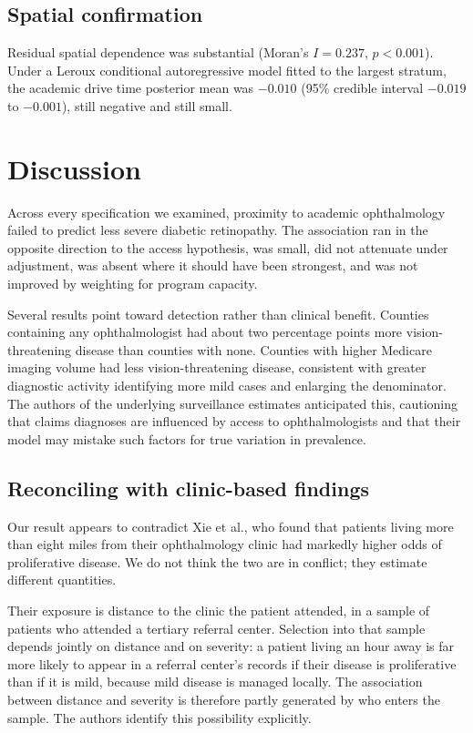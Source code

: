 \documentclass[11pt]{article}
\begin{document}
\subsection{Spatial confirmation}

Residual spatial dependence was substantial (Moran's $I = 0.237$, $p<0.001$).
Under a Leroux conditional autoregressive model fitted to the largest stratum,
the academic drive time posterior mean was $-0.010$ (95\% credible interval
$-0.019$ to $-0.001$), still negative and still small.

\section{Discussion}

Across every specification we examined, proximity to academic ophthalmology
failed to predict less severe diabetic retinopathy. The association ran in the
opposite direction to the access hypothesis, was small, did not attenuate under
adjustment, was absent where it should have been strongest, and was not improved
by weighting for program capacity.

Several results point toward detection rather than clinical benefit. Counties containing any
ophthalmologist had about two percentage points more vision-threatening disease
than counties with none. Counties with higher Medicare imaging volume had less
vision-threatening disease, consistent with greater diagnostic activity
identifying more mild cases and enlarging the denominator. The authors of the
underlying surveillance estimates anticipated this, cautioning that claims
diagnoses are influenced by access to ophthalmologists and that their model may
mistake such factors for true variation in prevalence.\citep{lundeen2023}

\subsection{Reconciling with clinic-based findings}

Our result appears to contradict Xie et al., who found that patients living more
than eight miles from their ophthalmology clinic had markedly higher odds of
proliferative disease.\citep{xie2025} We do not think the two are in conflict;
they estimate different quantities.

Their exposure is distance to the clinic the patient attended, in a sample of
patients who attended a tertiary referral center. Selection into that sample
depends jointly on distance and on severity: a patient living an hour away is
far more likely to appear in a referral center's records if their disease is
proliferative than if it is mild, because mild disease is managed locally. The
association between distance and severity is therefore partly generated by who
enters the sample. The authors identify this possibility explicitly.
\end{document}
